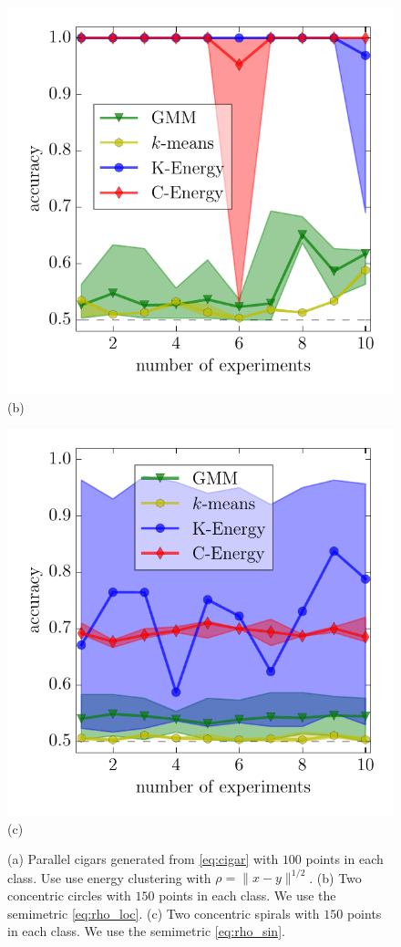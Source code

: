 \documentclass[aps,preprint,nofootinbib,floatfix]{revtex4-1}
\begin{document}
\begin{figure}
\begin{minipage}{0.33\textwidth}
\centering
\includegraphics[width=\textwidth]{circles.pdf}\\[-.8em]
(b)
\end{minipage}
\begin{minipage}{0.33\textwidth}
\centering
\includegraphics[width=\textwidth]{spirals.pdf}\\[-.8em]
(c)
\end{minipage}
\caption{
\label{fig:weird}
(a) Parallel cigars generated from \eqref{eq:cigar} with $100$ points
in each class. Use use energy clustering
with $\rho = \| x - y\|^{1/2}$. (b) Two concentric circles with $150$ points
in each class. We use the semimetric \eqref{eq:rho_loc}. 
(c) Two concentric spirals with
$150$ points in each class. We use the semimetric \eqref{eq:rho_sin}.
}
\end{figure}
\end{document}
